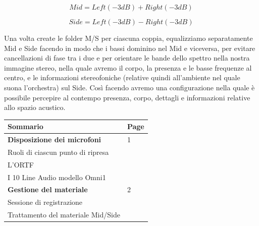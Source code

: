 \begin{equation}
	Mid = Left(-3dB) + Right(-3dB)
	\label{eq:mid}
\end{equation}

\begin{equation}
	Side = Left(-3dB) - Right(-3dB)
	\label{eq:mid}
\end{equation}

Una volta create le folder M/S per ciascuna coppia, equalizziamo separatamente Mid e Side facendo in modo che i bassi dominino nel Mid e viceversa, per evitare cancellazioni di fase tra i due e per orientare le bande dello spettro nella nostra immagine stereo, nella quale avremo il corpo, la presenza e le basse frequenze al centro, e le informazioni stereofoniche (relative quindi all'ambiente nel quale suona l'orchestra) sul Side. Così facendo avremo una configurazione nella quale è possibile percepire al contempo presenza, corpo, dettagli e informazioni relative allo spazio acustico.


\vfill\null

\newpage %

\begin{table}[htp]
\begin{tabular}{ll}
\textbf{Sommario} & \textbf{Page} \\
\hline
\textbf{Disposizione dei microfoni} & 1 \\
Ruoli di ciascun punto di ripresa & \\
L'ORTF & \\
I 10 Line Audio modello Omni1 & \\
\hline
\textbf{Gestione del materiale} & 2 \\
Sessione di registrazione & \\
Trattamento del materiale Mid/Side & \\

\end{tabular}
\end{table}


\vfill\null

\raggedright
%



